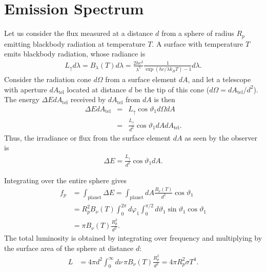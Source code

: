 \section{Emission Spectrum}

Let us consider the flux measured at a distance $d$ from a sphere of radius $R_p$ emitting blackbody radiation at temperature $T$. A surface with temperature $T$ emits blackbody radiation, whose radiance is
\begin{align}
L_{\uparrow} d \lambda = B_\lambda (T) d \lambda = \frac{2 h c^2}{\lambda^5} \frac{1}{\exp{(hc/\lambda k_B T)}-1} d \lambda.
\end{align}
Consider the radiation cone $d \Omega$ from a surface element $d A$, and let a telescope with aperture $d A_\mathrm{tel}$ located at distance $d$ be the tip of this cone ($d \Omega = d A_\mathrm{tel}/d^2$). The energy $\Delta E d A_\mathrm{tel}$ received by $d A_\mathrm{tel}$ from $d A$ is then
\begin{eqnarray}
\label{eq:brdfdef3}
\Delta E d A_\mathrm{tel} &=& L_\uparrow \cos{\vartheta_1} d \Omega d A \\
&=& \frac{L_\uparrow}{d^2} \cos{\vartheta_1} d A d A_\mathrm{tel}.
\end{eqnarray}
Thus, the irradiance or flux from the surface element $d A$ as seen by the observer is
\begin{eqnarray}
\label{eq:brdfdef6}
\Delta E = \frac{L_\uparrow}{d^2} \cos{\vartheta_1} d A.
\end{eqnarray}

Integrating over the entire sphere gives
\begin{align}
\label{eq:raddef}
f_p &= \int_\mathrm{planet} \Delta E = \int_\mathrm{planet} d A \frac{B_\nu (T)}{d^2} \cos{\vartheta_1} \\
&= R_p^2 B_\nu (T) \int_0^{2 \pi} d \varphi_1 \int_0^{\pi/2} d \vartheta_1 \sin{\vartheta_1} \cos{\vartheta_1}\\
&= \pi B_\nu (T) \frac{R_p^2}{d^2}.
\end{align}
The total luminosity is obtained by integrating over frequency and multiplying by the surface area of the sphere at distance $d$:
\begin{align}
\label{eq:raddeftot}
L &= 4 \pi d^2 \int_0^{\infty} d \nu \, \pi B_\nu (T) \frac{R_p^2}{d^2} = 4 \pi R_p^2 \sigma T^4.
\end{align}

